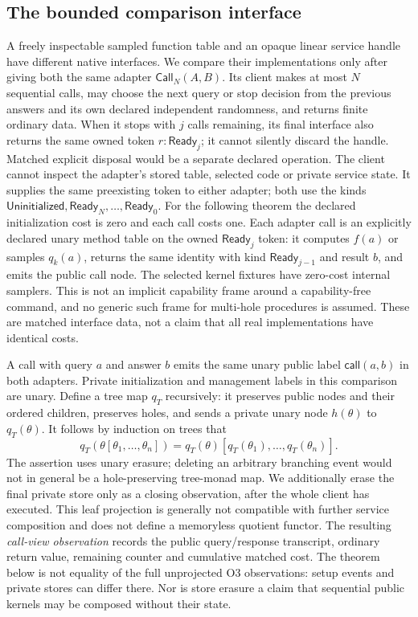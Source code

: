 \documentclass[11pt,a4paper]{article}
\theoremstyle{definition}
\newcommand{\Call}{\mathsf{Call}}
\begin{document}
\subsection{The bounded comparison interface}
A freely inspectable sampled function table and an opaque linear service
handle have different native interfaces. We compare their implementations
only after giving both the same adapter $\Call_N(A,B)$. Its client makes
at most $N$ sequential calls, may choose the next query or stop decision
from the previous answers and its own declared independent randomness,
and returns finite ordinary data. When it stops with $j$ calls remaining,
its final interface also returns the same owned token
$r:\mathsf{Ready}_j$; it cannot silently discard the handle. Matched
explicit disposal would be a separate declared operation. The client
cannot inspect the adapter's
stored table, selected code or private service state. It supplies the same
preexisting token to either adapter; both use the kinds
$\mathsf{Uninitialized},\mathsf{Ready}_N,\ldots,\mathsf{Ready}_0$.
For the following theorem the declared initialization cost is zero and
each call costs one. Each adapter call is an explicitly declared unary
method table on the owned $\mathsf{Ready}_j$ token: it computes $f(a)$
or samples $q_k(a)$, returns the same identity with kind
$\mathsf{Ready}_{j-1}$ and result $b$, and emits the public call node.
The selected kernel fixtures have zero-cost internal samplers. This is
not an implicit capability frame around a capability-free command, and
no generic such frame for multi-hole procedures is assumed.
These are matched interface data, not a claim that
all real implementations have identical costs.

A call with query $a$ and answer $b$ emits the same unary public label
$\mathsf{call}(a,b)$ in both adapters. Private initialization and management
labels in this comparison are unary. Define a tree map $q_T$ recursively:
it preserves public nodes and their ordered children, preserves holes,
and sends a private unary node $h(\theta)$ to $q_T(\theta)$. It follows by
induction on trees that
\[
 q_T(\theta[\theta_1,\ldots,\theta_n])
 =q_T(\theta)[q_T(\theta_1),\ldots,q_T(\theta_n)].
\]
The assertion uses unary erasure; deleting an arbitrary branching event
would not in general be a hole-preserving tree-monad map.
We additionally erase the final private store only as a closing
observation, after the whole client has executed. This leaf projection
is generally not compatible with further service composition and does
not define a memoryless quotient functor. The resulting
\emph{call-view observation} records the public query/response transcript,
ordinary return value, remaining counter and cumulative matched cost.
The theorem below is not equality of the full unprojected O3 observations:
setup events and private stores can differ there. Nor is store erasure a
claim that sequential public kernels may be composed without their state.
\end{document}
